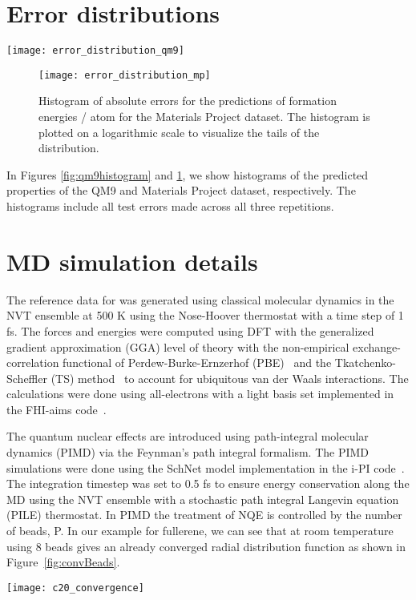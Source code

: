 \documentclass[aip,jcp,reprint,graphicx]{revtex4-1}
\newcommand{\new}[1]{#1}
\begin{document}
\section{\new{Error distributions}}\label{app:distribution}
\begin{figure*}
	\texttt{[image: error\_distribution\_qm9]}
	\caption{Histograms of absolute errors for all predicted properties of QM9. The histograms are plotted on a logarithmic scale to visualize the tails of the distribution. \label{fig:qm9histogram}}
\end{figure*}
\begin{figure}
	\texttt{[image: error\_distribution\_mp]}
	\caption{Histogram of absolute errors for the predictions of formation energies / atom for the Materials Project dataset. The histogram is plotted on a logarithmic scale to visualize the tails of the distribution. \label{fig:mphistogram}}
\end{figure}
In Figures \ref{fig:qm9histogram} and \ref{fig:mphistogram}, we show histograms of the predicted properties of the QM9 and Materials Project dataset, respectively.
The histograms include all test errors made across all three repetitions.

\section{\new{MD simulation details}}\label{app:MDdetails}
The reference data for  was generated using classical molecular dynamics in the NVT ensemble at 500 K using the Nose-Hoover thermostat with a time step of 1 fs. The forces and energies were computed using DFT with the generalized gradient approximation (GGA) level of theory with the non-empirical exchange-correlation functional of Perdew-Burke-Ernzerhof (PBE)~\citep{PBE1996}  and the Tkatchenko-Scheffler (TS) method~\citep{TS2009} to account for ubiquitous van der Waals interactions. The calculations were done using all-electrons with a light basis set implemented in the FHI-aims code~\citep{FHIaims2009}.

The quantum nuclear effects are introduced using path-integral molecular dynamics (PIMD) via the Feynman's path integral formalism. The PIMD simulations were done using the SchNet model implementation in the i-PI code~\citep{ceriotti2014pi}. The integration timestep was set to 0.5 fs to ensure energy conservation along the MD using the NVT ensemble with a stochastic path integral Langevin equation (PILE) thermostat\citep{pile2010}. In PIMD the treatment of NQE is controlled by the number of beads, P. In our example for  fullerene, we can see that at room temperature using 8 beads gives an already converged radial distribution function  as shown in Figure~\ref{fig:convBeads}.

\begin{figure*}
	\texttt{[image: c20\_convergence]}
	\caption{Histograms of absolute errors for all predicted properties of QM9. The histograms are plotted on a logarithmic scale to visualize the tails of the distribution. \label{fig:convBeads}}
\end{figure*}


\end{document}
